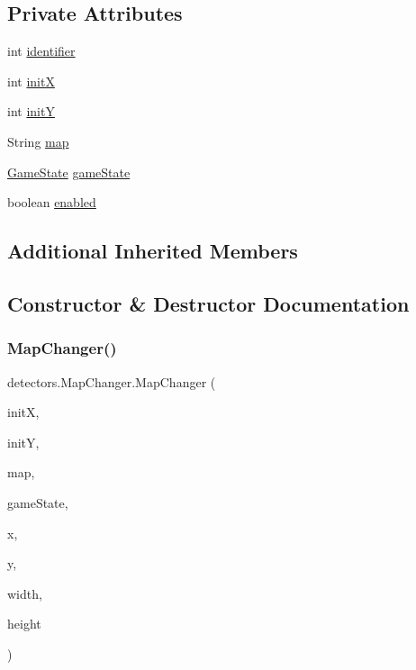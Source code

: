 \subsection*{Private Attributes}
\begin{DoxyCompactItemize}
\item 
int \mbox{\hyperlink{classdetectors_1_1_map_changer_a4c880379dc5b9cdd0c11d388ed7d28ca}{identifier}}
\item 
int \mbox{\hyperlink{classdetectors_1_1_map_changer_a45c8356dc930a1289333a55a1a13a606}{initX}}
\item 
int \mbox{\hyperlink{classdetectors_1_1_map_changer_a893e5aefb0e75665409f73b6e1542b59}{initY}}
\item 
String \mbox{\hyperlink{classdetectors_1_1_map_changer_ad642fa774f24afd2651f54d430608092}{map}}
\item 
\mbox{\hyperlink{classstates_1_1_game_state}{Game\+State}} \mbox{\hyperlink{classdetectors_1_1_map_changer_a2a72dbaade77a4f83acdc5ba1d745c48}{game\+State}}
\item 
boolean \mbox{\hyperlink{classdetectors_1_1_map_changer_a603d3a106676167a607d9acd5176f8f8}{enabled}}
\end{DoxyCompactItemize}
\subsection*{Additional Inherited Members}


\subsection{Constructor \& Destructor Documentation}
\mbox{\label{classdetectors_1_1_map_changer_a533001d33ce9a267a1fb928ec45f5354}} 
\subsubsection{\texorpdfstring{Map\+Changer()}{MapChanger()}\hspace{0.1cm}{\footnotesize\ttfamily [1/2]}}
{\footnotesize\ttfamily detectors.\+Map\+Changer.\+Map\+Changer (\begin{DoxyParamCaption}\item[{int}]{initX,  }\item[{int}]{initY,  }\item[{String}]{map,  }\item[{\mbox{\hyperlink{classstates_1_1_game_state}{Game\+State}}}]{game\+State,  }\item[{float}]{x,  }\item[{float}]{y,  }\item[{float}]{width,  }\item[{float}]{height }\end{DoxyParamCaption})\hspace{0.3cm}{\ttfamily [inline]}}


